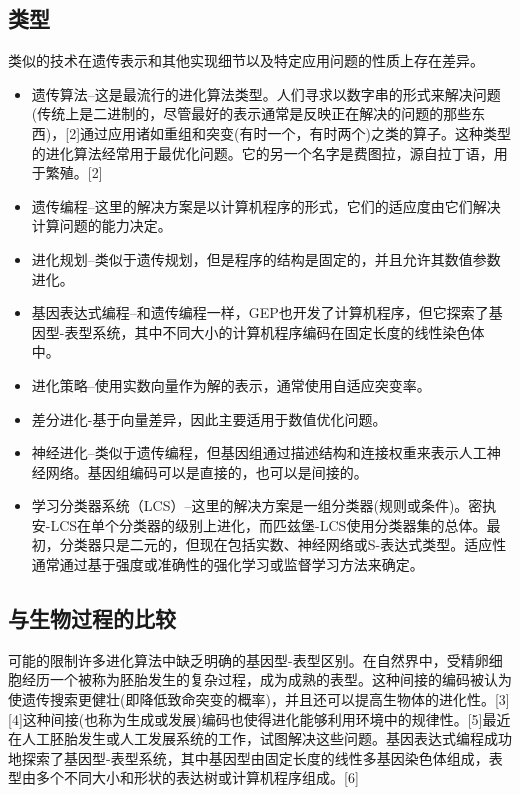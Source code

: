 \subsection{类型}
类似的技术在遗传表示和其他实现细节以及特定应用问题的性质上存在差异。
\begin{itemize}
\item 遗传算法–这是最流行的进化算法类型。人们寻求以数字串的形式来解决问题(传统上是二进制的，尽管最好的表示通常是反映正在解决的问题的那些东西)，[2]通过应用诸如重组和突变(有时一个，有时两个)之类的算子。这种类型的进化算法经常用于最优化问题。它的另一个名字是费图拉，源自拉丁语，用于繁殖。[2]
\item 遗传编程–这里的解决方案是以计算机程序的形式，它们的适应度由它们解决计算问题的能力决定。
\item 进化规划–类似于遗传规划，但是程序的结构是固定的，并且允许其数值参数进化。
\item 基因表达式编程–和遗传编程一样，GEP也开发了计算机程序，但它探索了基因型-表型系统，其中不同大小的计算机程序编码在固定长度的线性染色体中。
\item 进化策略–使用实数向量作为解的表示，通常使用自适应突变率。
\item 差分进化-基于向量差异，因此主要适用于数值优化问题。
\item 神经进化–类似于遗传编程，但基因组通过描述结构和连接权重来表示人工神经网络。基因组编码可以是直接的，也可以是间接的。
\item 学习分类器系统（LCS）–这里的解决方案是一组分类器(规则或条件)。密执安-LCS在单个分类器的级别上进化，而匹兹堡-LCS使用分类器集的总体。最初，分类器只是二元的，但现在包括实数、神经网络或S-表达式类型。适应性通常通过基于强度或准确性的强化学习或监督学习方法来确定。
\end{itemize}

\subsection{与生物过程的比较}
可能的限制许多进化算法中缺乏明确的基因型-表型区别。在自然界中，受精卵细胞经历一个被称为胚胎发生的复杂过程，成为成熟的表型。这种间接的编码被认为使遗传搜索更健壮(即降低致命突变的概率)，并且还可以提高生物体的进化性。[3][4]这种间接(也称为生成或发展)编码也使得进化能够利用环境中的规律性。[5]最近在人工胚胎发生或人工发展系统的工作，试图解决这些问题。基因表达式编程成功地探索了基因型-表型系统，其中基因型由固定长度的线性多基因染色体组成，表型由多个不同大小和形状的表达树或计算机程序组成。[6]

